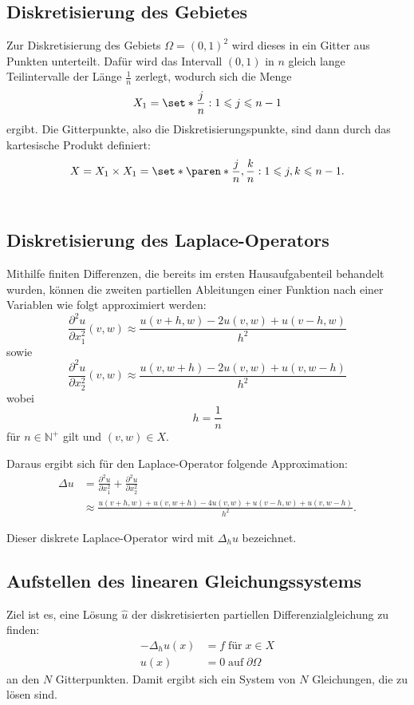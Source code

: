 \documentclass{scrartcl}
\newcommand\N{\mathbb{N}}
\begin{document}
\subsection{Diskretisierung des Gebietes}

Zur Diskretisierung des Gebiets \(\Omega = {(0,1)}^2\) wird dieses in ein
Gitter aus Punkten unterteilt. Dafür wird das Intervall \((0,1)\) in \(n\)
gleich lange Teilintervalle der Länge \(\frac{1}{n}\) zerlegt, wodurch sich die
Menge
\[
    X_1 = \set*{\frac{j}{n} : 1 \leqslant j \leqslant n - 1}
\]
ergibt. Die Gitterpunkte, also die Diskretisierungspunkte, sind dann durch
  das kartesische Produkt definiert:
\[
    X
    = X_1 \times X_1
    = \set*{\paren*{\frac{j}{n}, \frac{k}{n}} : 1 \leqslant j, k \leqslant n - 1}.
\]
~\cite{PPI_Poisson}

\subsection{Diskretisierung des Laplace-Operators}

Mithilfe finiten Differenzen, die bereits im ersten Hausaufgabenteil behandelt
wurden, können die zweiten partiellen Ableitungen einer Funktion nach einer
Variablen wie folgt approximiert werden:
\[
    \frac{\partial^2 u}{\partial x_1^2} (v, w) \approx \frac{u(v + h, w) - 2u(v, w) + u(v - h, w)}{h^2}
\]
sowie
\[
    \frac{\partial^2 u}{\partial x_2^2} (v, w) \approx \frac{u(v, w + h) - 2u(v, w) + u(v, w - h)}{h^2}
\]
wobei \[h = \frac{1}{n}\] für \(n \in \N^+\) gilt und \((v, w) \in X\).

Daraus ergibt sich für den Laplace-Operator folgende Approximation:
\begin{align*}
    \Delta u & = \frac{\partial^2 u}{\partial x_1^2}
    + \frac{\partial^2 u}{\partial x_2^2}              \\
             & \approx \frac{u(v + h, w) + u(v, w + h)
        - 4u(v, w) + u(v - h, w) + u(v, w - h)}{h^2}.
\end{align*}

Dieser diskrete Laplace-Operator wird mit \(\Delta_h u\) bezeichnet.

\subsection{Aufstellen des linearen Gleichungssystems}

Ziel ist es, eine Lösung \(\hat u\) der diskretisierten partiellen
Differenzialgleichung zu finden:
\begin{align*}
    -\Delta_{h} u(x) & = f \; \text{für} \; x \in X         \\
    u(x)             & = 0 \; \text{auf} \; \partial \Omega
\end{align*}
an den \(N\) Gitterpunkten. Damit ergibt sich ein System von \(N\)
Gleichungen, die zu lösen sind.
\end{document}

